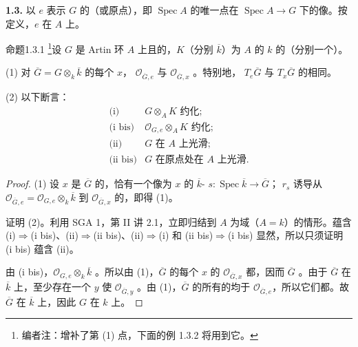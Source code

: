 \textbf{1.3.} 以 $e$ 表示 $G$ 的（或原点），即 $\operatorname{Spec}A$ 的唯一点在 $\operatorname{Spec}A\to G$ 下的像。按定义，$e$ 在 $A$ 上。
\begin{SGAresult}{命题}{1.3.1}
\footnote{编者注：增补了第 (1) 点，下面的例 1.3.2 将用到它。}设 $G$ 是 Artin 环 $A$ 上且的，$K$（分别 $\overline k$）为 $A$ 的 $k$ 的（分别一个）。

(1) 对 $\overline G=G\otimes_k\overline k$ 的每个 $x$， $\mathcal O_{\overline G,e}$ 与 $\mathcal O_{\overline G,x}$ 。特别地， $T_e\overline G$ 与 $T_x\overline G$ 的相同。

(2) 以下断言：
\[
\begin{array}{ll}
\text{(i)}&G\otimes_A K\text{ 约化};\\
\text{(i bis)}&\mathcal O_{G,e}\otimes_A K\text{ 约化};\\
\text{(ii)}&G\text{ 在 }A\text{ 上光滑};\\
\text{(ii bis)}&G\text{ 在原点处在 }A\text{ 上光滑}.
\end{array}
\]
\end{SGAresult}
\begin{proof}
(1) 设 $x$ 是 $\overline G$ 的，恰有一个像为 $x$ 的 $\overline k$- $s:\operatorname{Spec}\overline k\to\overline G$； $r_s$ 诱导从 $\mathcal O_{\overline G,e}=\mathcal O_{G,e}\otimes_k\overline k$ 到 $\mathcal O_{\overline G,x}$ 的，即得 (1)。

证明 (2)。利用 SGA 1，第 II 讲 2.1，立即归结到 $A$ 为域（$A=k$）的情形。蕴含 (i)$\Rightarrow$(i bis)、(ii)$\Rightarrow$(ii bis)、(ii)$\Rightarrow$(i) 和 (ii bis)$\Rightarrow$(i bis) 显然，所以只须证明 (i bis) 蕴含 (ii)。

由 (i bis)，$\mathcal O_{G,e}\otimes_k\overline k$ 。所以由 (1)，$\overline G$ 的每个 $x$ 的 $\mathcal O_{\overline G,x}$ 都，因而 $\overline G$ 。由于 $\overline G$ 在 $\overline k$ 上，至少存在一个 $y$ 使 $\mathcal O_{\overline G,y}$ 。由 (1)，$\overline G$ 的所有的均于 $\mathcal O_{\overline G,e}$，所以它们都。故 $\overline G$ 在 $\overline k$ 上，因此 $G$ 在 $k$ 上。
\end{proof}
